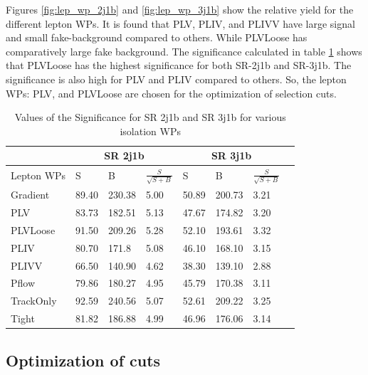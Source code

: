  Figures \ref{fig:lep_wp_2j1b} and \ref{fig:lep_wp_3j1b} show the relative yield for the different lepton WPs.  It is found that PLV, PLIV, and PLIVV have large signal and small fake-background compared to others. While PLVLoose has comparatively large fake background. The significance calculated in table \ref{tab:WP_sig} shows that PLVLoose has the highest significance for both SR-2j1b and SR-3j1b. The significance is also high for PLV and PLIV compared  to others. So, the lepton WPs: PLV, and PLVLoose are chosen for the optimization of selection cuts. 
 
\begin{table}[h!]
\centering
\begin{tabular}{@{} *8l  @{}}
\toprule
 & \multicolumn{3}{c}{SR 2j1b} & \multicolumn{3}{c}{SR 3j1b} \\
 \midrule
Lepton WPs & S & B & $\frac{S}{\sqrt{S+B}}$ & S & B & $\frac{S}{\sqrt{S+B}}$  \\ [0.2cm]
\toprule
 Gradient & 89.40 & 230.38 & 5.00 & 50.89 & 200.73 &  3.21  \\

PLV  & 83.73 & 182.51 &  5.13 & 47.67 & 174.82 &  3.20 \\ 

PLVLoose  & 91.50 & 209.26 &  5.28 & 52.10 & 193.61 &  3.32 \\

PLIV  & 80.70 & 171.8 &  5.08 & 46.10 & 168.10 &  3.15 \\ 

PLIVV  & 66.50 & 140.90 &  4.62 & 38.30 & 139.10 &  2.88 \\ 

Pflow & 79.86 & 180.27 & 4.95  & 45.79 & 170.38 & 3.11 \\

TrackOnly & 92.59 & 240.56 &  5.07 & 52.61 & 209.22 & 3.25 \\

Tight & 81.82 & 186.88 & 4.99 & 46.96 & 176.06 & 3.14  \\
\bottomrule
\end{tabular}
\caption{Values of the Significance for SR 2j1b and SR 3j1b for various isolation WPs}
\label{tab:WP_sig}
\end{table}  



\subsection{Optimization of cuts}
\label{subsec:Opti_cuts}

